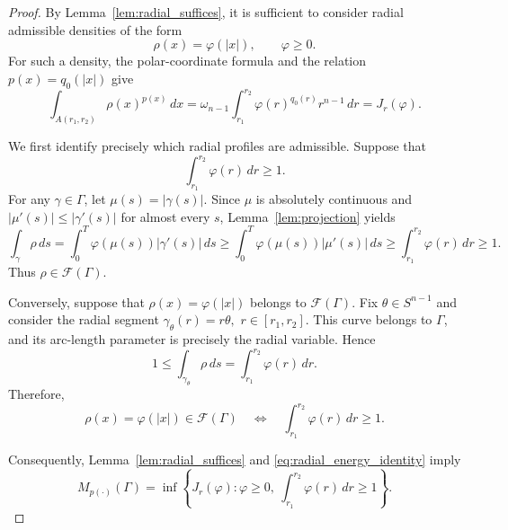 \documentclass[12pt]{amsart}
\numberwithin{equation}{section}
\theoremstyle{plain}
\theoremstyle{definition}
\begin{document}
\begin{proof}
By Lemma~\ref{lem:radial_suffices}, it is sufficient to consider
radial admissible densities of the form
\begin{equation*}
\rho(x)=\varphi(|x|),
\qquad
\varphi\ge0.
\end{equation*}
For such a density, the polar-coordinate formula and the relation
$p(x)=q_0(|x|)$ give
\begin{equation}
\label{eq:radial_energy_identity}
\int_{A(r_1,r_2)}
\rho(x)^{p(x)}\,dx
=
\omega_{n-1}
\int_{r_1}^{r_2}
\varphi(r)^{q_0(r)}r^{n-1}\,dr
=
J_r(\varphi).
\end{equation}

We first identify precisely which radial profiles are admissible.
Suppose that
\begin{equation*}
\int_{r_1}^{r_2}\varphi(r)\,dr\ge1.
\end{equation*}
For any $\gamma\in\Gamma$, let $\mu(s)=|\gamma(s)|$. Since
$\mu$ is absolutely continuous and
$|\mu'(s)|\le|\gamma'(s)|$ for almost every $s$, Lemma~\ref{lem:projection}
yields
\begin{equation*}
\int_\gamma \rho\,ds
=
\int_0^T
\varphi(\mu(s))|\gamma'(s)|\,ds
\ge
\int_0^T
\varphi(\mu(s))|\mu'(s)|\,ds
\ge
\int_{r_1}^{r_2}\varphi(r)\,dr
\ge1.
\end{equation*}
Thus $\rho\in\mathcal F(\Gamma)$.

Conversely, suppose that $\rho(x)=\varphi(|x|)$ belongs to
$\mathcal F(\Gamma)$. Fix $\theta\in S^{n-1}$ and consider the radial
segment $\gamma_\theta(r)=r\theta,$ $r\in[r_1,r_2]$.
This curve belongs to $\Gamma$, and its arc-length parameter is precisely
the radial variable. Hence
\begin{equation*}
1
\le
\int_{\gamma_\theta}\rho\,ds
=
\int_{r_1}^{r_2}\varphi(r)\,dr.
\end{equation*}
Therefore,
\begin{equation}
\label{eq:radial_admissibility_characterization}
\rho(x)=\varphi(|x|)\in\mathcal F(\Gamma)
\quad\Longleftrightarrow\quad
\int_{r_1}^{r_2}\varphi(r)\,dr\ge1.
\end{equation}

Consequently, Lemma~\ref{lem:radial_suffices} and
\eqref{eq:radial_energy_identity} imply
\begin{equation}
\label{eq:annulus_inf_geq}
M_{p(\cdot)}(\Gamma)
=
\inf
\left\{
J_r(\varphi):
\varphi\ge0,\
\int_{r_1}^{r_2}\varphi(r)\,dr\ge1
\right\}.
\end{equation}


\end{proof}
\end{document}
